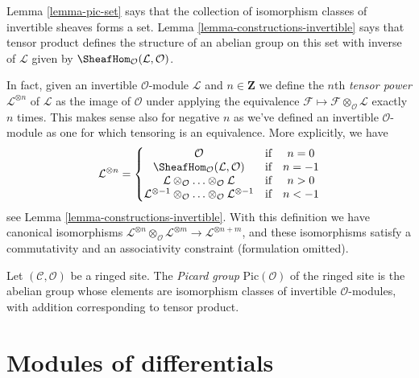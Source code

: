 \noindent
Lemma \ref{lemma-pic-set} says that the collection of
isomorphism classes of invertible sheaves forms a set.
Lemma \ref{lemma-constructions-invertible} says that
tensor product defines the structure of an abelian group
on this set with inverse of $\mathcal{L}$ given by
$\SheafHom_\mathcal{O}(\mathcal{L}, \mathcal{O})$.

\medskip\noindent
In fact, given an invertible $\mathcal{O}$-module
$\mathcal{L}$ and $n \in \mathbf{Z}$ we define the
$n$th {\it tensor power} $\mathcal{L}^{\otimes n}$ of $\mathcal{L}$
as the image of $\mathcal{O}$ under applying the equivalence
$\mathcal{F} \mapsto \mathcal{F} \otimes_\mathcal{O} \mathcal{L}$
exactly $n$ times. This makes sense also for negative $n$ as
we've defined an invertible
$\mathcal{O}$-module as one for which tensoring is an equivalence.
More explicitly, we have
$$
\mathcal{L}^{\otimes n} =
\left\{
\begin{matrix}
\mathcal{O} & \text{if} & n = 0 \\
\SheafHom_\mathcal{O}(\mathcal{L}, \mathcal{O}) & \text{if} & n = -1\\
\mathcal{L} \otimes_\mathcal{O} \ldots \otimes_\mathcal{O} \mathcal{L}
& \text{if} & n > 0 \\
\mathcal{L}^{\otimes -1} \otimes_\mathcal{O} \ldots
\otimes_\mathcal{O} \mathcal{L}^{\otimes -1}
& \text{if} & n < -1
\end{matrix}
\right.
$$
see Lemma \ref{lemma-constructions-invertible}.
With this definition we have canonical isomorphisms
$\mathcal{L}^{\otimes n} \otimes_\mathcal{O}
\mathcal{L}^{\otimes m} \to
\mathcal{L}^{\otimes n + m}$, and these isomorphisms
satisfy a commutativity and an associativity constraint
(formulation omitted).

\begin{definition}
\label{definition-pic}
Let $(\mathcal{C}, \mathcal{O})$ be a ringed site.
The {\it Picard group} $\text{Pic}(\mathcal{O})$ of
the ringed site is the
abelian group whose elements are isomorphism classes of
invertible $\mathcal{O}$-modules, with addition
corresponding to tensor product.
\end{definition}









\section{Modules of differentials}
\label{section-differentials}

